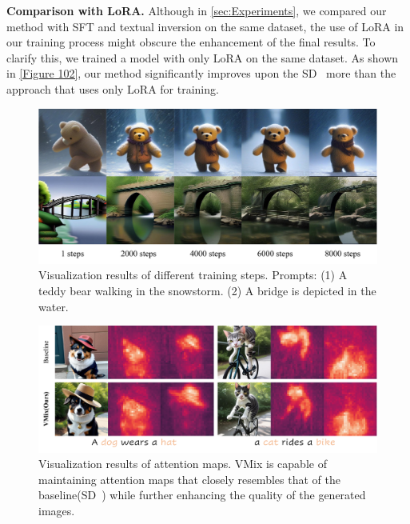\noindent \textbf{Comparison with LoRA.} Although in \cref{sec:Experiments}, we compared our method with SFT and textual inversion on the same dataset, the use of LoRA in our training process might obscure the enhancement of the final results. To clarify this, we trained a model with only LoRA on the same dataset. As shown in \cref{Figure 102}, our method significantly improves upon the SD~\cite{rombach2022high} more than the approach that uses only LoRA for training.

\begin{figure}[ht]
\centering
\includegraphics[scale=0.4]{sup_fig1.pdf}
    \caption{Visualization results of different training steps. Prompts: (1) A teddy bear walking in the snowstorm. (2) A bridge is depicted in the water.}
    \label{Figure 100}
\end{figure}

\begin{figure}[ht]
\centering
\includegraphics[scale=0.33]{sup_fig2.pdf}
    \caption{Visualization results of attention maps. VMix is capable of maintaining attention maps that closely resembles that of the baseline(SD~\cite{rombach2022high}) while further enhancing the quality of the generated images.}
    \label{Figure 101}
\end{figure}

